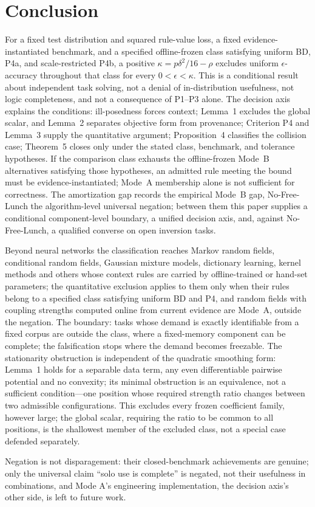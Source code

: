 \section{Conclusion}
\label{ch:conclusion}

For a fixed test distribution and squared rule-value loss, a fixed evidence-instantiated benchmark, and a specified offline-frozen class satisfying uniform BD, P4a, and scale-restricted P4b, a positive $\kappa = p\delta^2/16-\rho$ excludes uniform $\epsilon$-accuracy throughout that class for every $0<\epsilon<\kappa$. This is a conditional result about independent task solving, not a denial of in-distribution usefulness, not logic completeness, and not a consequence of P1--P3 alone. The decision axis explains the conditions: ill-posedness forces context; Lemma~1 excludes the global scalar, and Lemma~2 separates objective form from provenance; Criterion P4 and Lemma~3 supply the quantitative argument; Proposition~4 classifies the collision case; Theorem~5 closes only under the stated class, benchmark, and tolerance hypotheses. If the comparison class exhausts the offline-frozen Mode~B alternatives satisfying those hypotheses, an admitted rule meeting the bound must be evidence-instantiated; Mode~A membership alone is not sufficient for correctness. The amortization gap records the empirical Mode~B gap, No-Free-Lunch the algorithm-level universal negation; between them this paper supplies a conditional component-level boundary, a unified decision axis, and, against No-Free-Lunch, a qualified converse on open inversion tasks.

Beyond neural networks the classification reaches Markov random fields, conditional random fields, Gaussian mixture models, dictionary learning, kernel methods and others whose context rules are carried by offline-trained or hand-set parameters; the quantitative exclusion applies to them only when their rules belong to a specified class satisfying uniform BD and P4, and random fields with coupling strengths computed online from current evidence are Mode~A, outside the negation. The boundary: tasks whose demand is exactly identifiable from a fixed corpus are outside the class, where a fixed-memory component can be complete; the falsification stops where the demand becomes freezable. The stationarity obstruction is independent of the quadratic smoothing form: Lemma~1 holds for a separable data term, any even differentiable pairwise potential and no convexity; its minimal obstruction is an equivalence, not a sufficient condition---one position whose required strength ratio changes between two admissible configurations. This excludes every frozen coefficient family, however large; the global scalar, requiring the ratio to be common to all positions, is the shallowest member of the excluded class, not a special case defended separately.

Negation is not disparagement: their closed-benchmark achievements are genuine; only the universal claim ``solo use is complete'' is negated, not their usefulness in combinations, and Mode A's engineering implementation, the decision axis's other side, is left to future work.
